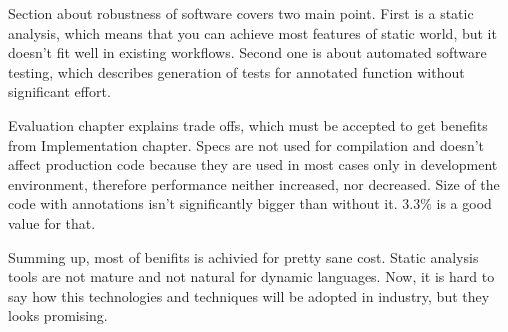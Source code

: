 Section about robustness of software covers two main point. First is a static
analysis, which means that you can achieve most features of static world, but it
doesn't fit well in existing workflows. Second one is about automated software
testing, which describes generation of tests for annotated function without
significant effort.

Evaluation chapter explains trade offs, which must be accepted to get benefits
from Implementation chapter. Specs are not used for compilation and doesn't
affect production code because they are used in most cases only in development
environment, therefore performance neither increased, nor decreased. Size of the
code with annotations isn't significantly bigger than without it. $3.3\%$ is a
good value for that.

Summing up, most of benifits is achivied for pretty sane cost. Static analysis
tools are not mature and not natural for dynamic languages. Now, it is hard to
say how this technologies and techniques will be adopted in industry, but they
looks promising.
